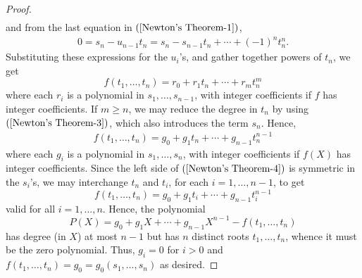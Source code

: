 \begin{proof}
\begin{equation}
\begin{aligned}
\end{aligned}
\end{equation}
and from the last equation in $(\ref{Newton's Theorem-1})$,
\begin{align}\label{Newton's Theorem-3}
0=s_n-u_{n-1}t_n=s_n-s_{n-1}t_n+\cdots+(-1)^nt_n^n.
\end{align}
Substituting these expressions for the $u_i$'s, and gather together powers of $t_n$, we get
\[f(t_1,\dots,t_n)=r_0+r_1t_n+\cdots+r_mt_n^m\]
where each $r_i$ is a polynomial in $s_1,\dots,s_{n-1}$, with integer coefficients if $f$ has integer coefficients. If $m\geq n$, we may reduce the degree in $t_n$ by using $(\ref{Newton's Theorem-3})$, which also introduces the term $s_n$. Hence,
\begin{align}\label{Newton's Theorem-4}
f(t_1,\dots,t_n)=g_0+g_1t_n+\cdots+g_{n-1}t_n^{n-1}
\end{align}
where each $g_i$ is a polynomial in $s_1,\dots,s_n$, with integer coefficients if $f(X)$ has integer coefficients. Since the left side of $(\ref{Newton's Theorem-4})$ is symmetric in the $s_i$'s, we may interchange $t_n$ and $t_i$, for each $i=1,\dots,n-1$, to get
\[f(t_1,\dots,t_n)=g_0+g_1t_i+\cdots+g_{n-1}t_{i}^{n-1}\]
valid for all $i=1,\dots,n$. Hence, the polynomial
\[P(X)=g_0+g_1X+\cdots+g_{n-1}X^{n-1}-f(t_1,\dots,t_n)\]
has degree (in $X$) at most $n-1$ but has $n$ distinct roots $t_1,\dots,t_n$, whence it must be the zero polynomial. Thus, $g_i=0$ for $i>0$ and $f(t_1,\dots,t_n)=g_0=g_0(s_1,\dots,s_n)$ as desired.
\end{proof}
